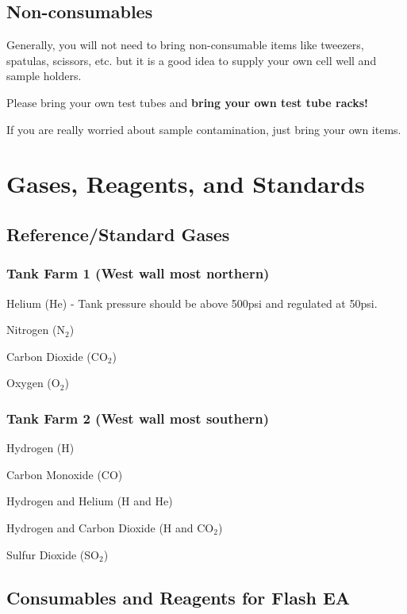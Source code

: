 \documentclass[12pt]{../SOP3}\usepackage[]{graphicx}\usepackage[]{color}
\begin{document}
\subsection{Non-consumables}

\NP Generally, you will not need to bring non-consumable items like tweezers, spatulas, scissors, etc. but it is a good idea to supply your own cell well and sample holders.

\NP Please bring your own test tubes and \textbf{bring your own test tube racks!}

\NP If you are really worried about sample contamination, just bring your own items.

\section{Gases, Reagents, and Standards}

\subsection{Reference/Standard Gases}

\subsubsection{Tank Farm 1 (West wall most northern)}

\NP Helium (He) - Tank pressure should be above 500psi and regulated at 50psi.

\NP Nitrogen (N$_2$)

\NP Carbon Dioxide (CO$_2$)

\NP Oxygen (O$_2$)

\subsubsection{Tank Farm 2 (West wall most southern)}

\NP Hydrogen (H)

\NP Carbon Monoxide (CO)

\NP Hydrogen and Helium (H and He)

\NP Hydrogen and Carbon Dioxide (H and CO$_2$)

\NP Sulfur Dioxide (SO$_2$)

\subsection{Consumables and Reagents for Flash EA} \label{subsec:Consumables and Reagents for Flash EA}
\end{document}
